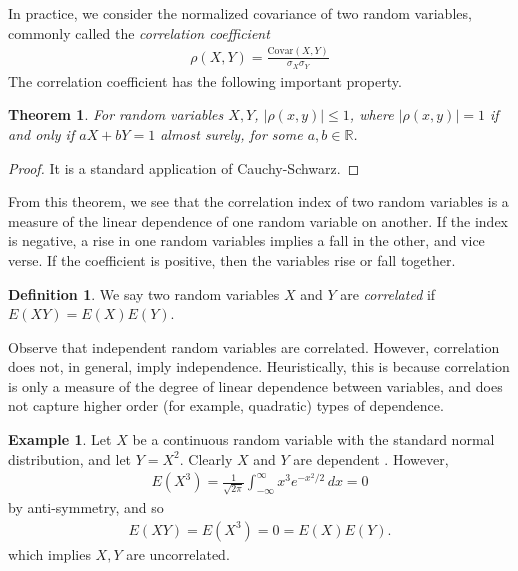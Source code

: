 \documentclass[12pt]{article}
\newcommand{\rr}{\mathbb{R}}
\newcommand{\covar}{\text{Covar}}
\theoremstyle{plain}
\newtheorem{theorem}{Theorem}
\theoremstyle{definition}
\newtheorem*{definition}{Definition}
\newtheorem*{example}{Example}
\theoremstyle{remark}
\numberwithin{equation}{section}  %
\begin{document}
In practice, we consider the normalized covariance of two random variables,
commonly called the \emph{correlation coefficient}
\begin{align*}
\rho(X,Y) = \frac{\covar(X,Y)}{\sigma_X \sigma_Y}
\end{align*}
The correlation coefficient has the following important property.
\begin{theorem}
For random variables $X, Y$, $|\rho(x,y)| \le 1$, where $|\rho(x,y)| = 1$ if and
only if $aX + bY = 1$ almost surely, for some $a,b \in \rr$. 
\end{theorem}
\begin{proof}
It is a standard application of Cauchy-Schwarz.
\end{proof}
From this theorem, we see that the correlation index of two random variables is
a measure of the linear dependence of one random variable on another. If the
index is negative, a rise in one random variables implies a fall in the other,
and vice verse. If the coefficient is positive, then the variables rise or fall
together.
\begin{definition}
We say two random variables $X$ and $Y$ are \emph{correlated} 
if $E(XY) = E(X)E(Y)$.
\end{definition}
Observe that independent random variables are correlated. However,
correlation does not, in general, imply independence. Heuristically, this is
because correlation is only a measure of the degree of linear dependence
between variables, and does not capture higher order (for example, quadratic)
types of dependence. 
\begin{example}
Let $X$ be a continuous random variable with the standard normal distribution,
and let $Y = X^2$. Clearly $X$ and $Y$ are dependent . However,
\begin{align*}
E(X^3) = \frac{1}{\sqrt{2 \pi}}\int_{-\infty}^{\infty} x^3 e^{-x^2/2} \, dx = 0
\end{align*}
by anti-symmetry, and so
\begin{align*}
E(XY) = E(X^3) = 0 = E(X) E(Y).
\end{align*}
which implies $X, Y$ are uncorrelated.
\end{example}
\end{document}

